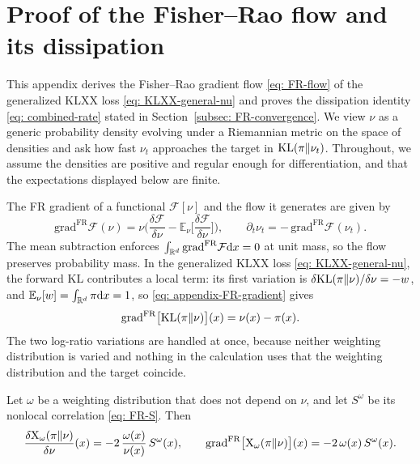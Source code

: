 \documentclass{article}
\begin{document}
{
	
	
}

\appendix

\section{Proof of the Fisher--Rao flow and its dissipation}
\label{sec: appendix-FR}

This appendix derives the Fisher--Rao gradient flow \eqref{eq: FR-flow} of the generalized KLXX loss \eqref{eq: KLXX-general-nu} and proves the dissipation identity \eqref{eq: combined-rate} stated in Section~\ref{subsec: FR-convergence}. We view $\nu$ as a generic probability density evolving under a Riemannian metric on the space of densities \citep{ambrosio2008gradient,villani2009optimal} and ask how fast $\nu_t$ approaches the target in $\mathrm{KL}(\pi\|\nu_t)$.
Throughout, we assume the densities are positive and regular enough for differentiation, and that the expectations displayed below are finite.

The FR gradient of a functional $\mathcal F[\nu]$ and the flow it generates are given by
\begin{equation}
    \mathrm{grad}^{\mathrm{FR}}\mathcal F(\nu) = \nu\biggl(\frac{\delta\mathcal F}{\delta\nu} - \mathbb E_{\nu}\Big[\frac{\delta\mathcal F}{\delta\nu}\Big]\biggr),
    \qquad
    \partial_t\nu_t = -\,\mathrm{grad}^{\mathrm{FR}}\mathcal F(\nu_t).
    \label{eq: appendix-FR-gradient}
\end{equation}
The mean subtraction enforces $\int_{\mathbb R^d}\mathrm{grad}^{\mathrm{FR}}\mathcal F\mathrm{d} x = 0$ at unit mass, so the flow preserves probability mass.
In the generalized KLXX loss \eqref{eq: KLXX-general-nu},
the forward KL contributes a local term: its first variation is $\delta\mathrm{KL}(\pi\|\nu)/\delta\nu = -w$, and $\mathbb E_\nu[w] = \int_{\mathbb R^d}\pi\mathrm{d} x = 1$, so \eqref{eq: appendix-FR-gradient} gives
\begin{equation}
    \mathrm{grad}^{\mathrm{FR}}\bigl[\mathrm{KL}(\pi\|\nu)\bigr](x) = \nu(x)-\pi(x).
    \label{eq: appendix-FR-grad-KL}
\end{equation}
The two log-ratio variations are handled at once, because neither weighting distribution is varied and nothing in the calculation uses that the weighting distribution and the target coincide.

\begin{lemma}
\label{lem: appendix-variation}
Let $\omega$ be a weighting distribution that does not depend on $\nu$, and let $S^{\omega}$ be its nonlocal correlation \eqref{eq: FR-S}. Then
\begin{equation}
    \frac{\delta \mathrm{X}_\omega(\pi\|\nu)}{\delta\nu}(x) = -2\,\frac{\omega(x)}{\nu(x)}\,S^{\omega}(x),
    \qquad
    \mathrm{grad}^{\mathrm{FR}}\bigl[\mathrm{X}_\omega(\pi\|\nu)\bigr](x) = -2\,\omega(x)\,S^{\omega}(x).
    \label{eq: appendix-FR-grad-X}
\end{equation}
\end{lemma}
\end{document}
